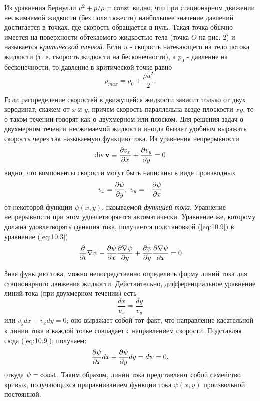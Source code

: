 Из уравнения Бернулли $v^2+p/\rho = \mathop{\mathrm{const}}\nolimits$ видно, что при стационарном движении
несжимаемой жидкости (без поля тяжести) наибольшее значение давлений достигается
в точках, где скорость обращается в нуль. Такая точка обычно имеется на
поверхности обтекаемого жидкостью тела (точка $O$ на рис. 2) и называется
\textit{критической точкой}. Если $u$ - скорость натекающего на тело потока
жидкости (т. е. скорость жидкости на бесконечности), а $p_0$ - давление на
бесконечности, то давление в критической точке равно
\begin{equation}
   \label{eq:10.8}
   p_{max} = p_0 + \frac{\rho u^2}{2}.
\end{equation}

Если распределение скоростей в движущейся жидкости зависит только от двух
кородинат, скажем от $x$ и $y$, причем скорость параллельна везде плоскости
$xy$, то о таком течении говорят как о двухмерном или плоском. Для решения задач
о двухмерном течении несжимаемой жидкости иногда бывает удобным выражать
скорость через так называемую функцию тока. Из уравнения непрерывности
\[
   \mathop{\mathrm{div}}\nolimits { \mathbf{v} } \equiv \frac{\partial{v_x}}{\partial{x}} + \frac{\partial{v_y}}{\partial{y}} = 0
\]
видно, что компоненты скорости могут быть написаны в виде производных
\begin{equation}
   \label{eq:10.9}
   v_x = \frac{\partial{\psi}}{\partial{y}},\; v_y = -\frac{\partial{\psi}}{\partial{x}}
\end{equation}
от некоторой функции $\psi(x,y)$, называемой \textit{функцией тока}. Уравнение
непрерывности при этом удовлетворяется автоматически. Уравнение же, которому
должна удовлетворять функция тока, получается подстановкой (\ref{eq:10.9}) в уравнение (\ref{eq:10.3})
\begin{equation}
   \label{eq:10.10}
   \frac{\partial}{\partial t} \nabla \psi -
   \frac{\partial{\psi}}{\partial{x}}\frac{\partial{\nabla\psi}}{\partial{y}}+
   \frac{\partial{\psi}}{\partial{y}}\frac{\partial{\nabla\psi}}{\partial{x}} = 0
\end{equation}

Зная функцию тока, можно непосредственно определить форму линий тока для
стационарного движения жидкости. Действительно, дифференциальное уравнение линий
тока (при двухмерном течении) есть
\[
   \frac{dx}{v_x} = \frac{dy}{v_y}
\]
или $v_y dx - v_x dy = 0$; оно выражает собой тот факт, что направление
касательной к линии тока в каждой точке совпадает с направлением скорости.
Подставляя сюда (\ref{eq:10.9}), получаем:
\[
   \frac{\partial{\psi}}{\partial{x}}dx + \frac{\partial{\psi}}{\partial{y}}dy = d\psi = 0,
\]
откуда $\psi = \mathop{\mathrm{const}}\nolimits$. Таким образом, линии тока представляют собой семейство
кривых, получающихся приравниванием функции тока $\psi(x,y)$ произвольной
постоянной.

